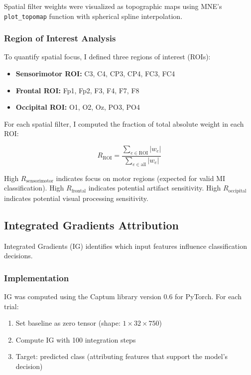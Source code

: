 Spatial filter weights were visualized as topographic maps using MNE's \texttt{plot\_topomap} function with spherical spline interpolation.

\subsubsection{Region of Interest Analysis}

To quantify spatial focus, I defined three regions of interest (ROIs):

\begin{itemize}
    \item \textbf{Sensorimotor ROI:} C3, C4, CP3, CP4, FC3, FC4
    \item \textbf{Frontal ROI:} Fp1, Fp2, F3, F4, F7, F8
    \item \textbf{Occipital ROI:} O1, O2, Oz, PO3, PO4
\end{itemize}

For each spatial filter, I computed the fraction of total absolute weight in each ROI:

\begin{equation}
    R_{\text{ROI}} = \frac{\sum_{e \in \text{ROI}} |w_e|}{\sum_{e \in \text{all}} |w_e|}
\end{equation}

High $R_{\text{sensorimotor}}$ indicates focus on motor regions (expected for valid MI classification). High $R_{\text{frontal}}$ indicates potential artifact sensitivity. High $R_{\text{occipital}}$ indicates potential visual processing sensitivity.


\subsection{Integrated Gradients Attribution}
\label{subsec:methods_ig}

Integrated Gradients (IG) identifies which input features influence classification decisions.

\subsubsection{Implementation}

IG was computed using the Captum library version 0.6 \cite{kokhlikyan2020captum} for PyTorch. For each trial:

\begin{enumerate}
    \item Set baseline as zero tensor (shape: $1 \times 32 \times 750$)
    \item Compute IG with 100 integration steps
    \item Target: predicted class (attributing features that support the model's decision)
\end{enumerate}


